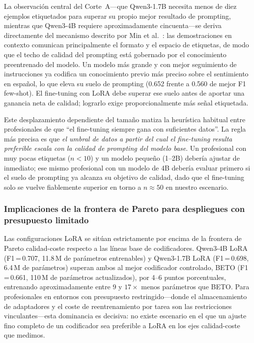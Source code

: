 \documentclass[conference]{IEEEtran}
\begin{document}
La observación central del Corte~A---que Qwen3-1.7B necesita menos de diez
ejemplos etiquetados para superar su propio mejor resultado de prompting,
mientras que Qwen3-4B requiere aproximadamente cincuenta---se deriva
directamente del mecanismo descrito por
Min et al.~\cite{min2022rethinking}: las demostraciones en contexto comunican
principalmente el formato y el espacio de etiquetas, de modo que el techo de
calidad del prompting está gobernado por el conocimiento preentrenado del
modelo.
Un modelo más grande y con mejor seguimiento de instrucciones ya codifica un
conocimiento previo más preciso sobre el sentimiento en español, lo que eleva
su suelo de prompting (0.652 frente a 0.560 de mejor F1 few-shot).
El fine-tuning con LoRA debe superar ese suelo antes de aportar una ganancia
neta de calidad; lograrlo exige proporcionalmente más señal etiquetada.

Este desplazamiento dependiente del tamaño matiza la heurística habitual entre
profesionales de que ``el fine-tuning siempre gana con suficientes datos''.
La regla más precisa es que \emph{el umbral de datos a partir del cual el
fine-tuning resulta preferible escala con la calidad de prompting del modelo
base}.
Un profesional con muy pocas etiquetas ($n < 10$) y un modelo pequeño (1--2B)
debería ajustar de inmediato; ese mismo profesional con un modelo de 4B debería
evaluar primero si el suelo de prompting ya alcanza su objetivo de calidad,
dado que el fine-tuning solo se vuelve fiablemente superior en torno a
$n \approx 50$ en nuestro escenario.

\subsubsection*{Implicaciones de la frontera de Pareto para despliegues con presupuesto limitado}

Las configuraciones LoRA se sitúan estrictamente por encima de la frontera de
Pareto calidad-coste respecto a las líneas base de codificadores.
Qwen3-4B LoRA (F1\,=\,0.707, 11.8\,M de parámetros entrenables) y Qwen3-1.7B
LoRA (F1\,=\,0.698, 6.4\,M de parámetros) superan ambos al mejor codificador
controlado, BETO (F1\,=\,0.661, 110\,M de parámetros actualizados), por 4--6
puntos porcentuales, entrenando aproximadamente entre $9$ y $17\times$ menos
parámetros que BETO.
Para profesionales en entornos con presupuesto restringido---donde el
almacenamiento de adaptadores y el coste de reentrenamiento por tarea son las
restricciones vinculantes---esta dominancia es decisiva: no existe escenario en
el que un ajuste fino completo de un codificador sea preferible a LoRA en los
ejes calidad-coste que medimos.
\end{document}
